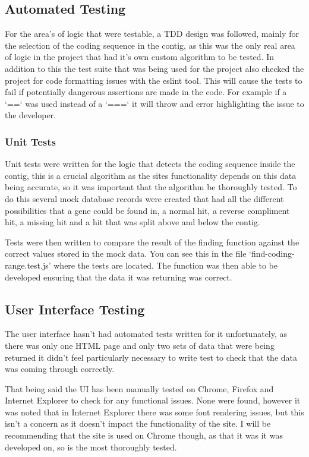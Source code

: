 \subsection{Automated Testing}
For the area's of logic that were testable, a TDD design was followed, mainly for the selection of the coding sequence in the contig, as this was the only real area of logic in the project that had it's own custom algorithm to be tested. In addition to this the test suite that was being used for the project also checked the project for code formatting issues with the eslint\cite{eslint} tool. This will cause the tests to fail if potentially dangerous assertions are made in the code. For example if a `==` was used instead of a `===` it will throw and error highlighting the issue to the developer. 

\subsubsection{Unit Tests}
Unit tests were written for the logic that detects the coding sequence inside the contig, this is a crucial algorithm as the sites functionality depends on this data being accurate, so it was important that the algorithm be thoroughly tested. To do this several mock database records were created that had all the different possibilities that a gene could be found in, a normal hit, a reverse compliment hit, a missing hit and a hit that was split above and below the contig. 

Tests were then written to compare the result of the finding function against the correct values stored in the mock data. You can see this in the file `find-coding-range.test.js' where the tests are located. The function was then able to be developed ensuring that the data it was returning was correct. 

\subsection{User Interface Testing}
The user interface hasn't had automated tests written for it unfortunately, as there was only one HTML page and only two sets of data that were being returned it didn't feel particularly necessary to write test to check that the data was coming through correctly. 

That being said the UI has been manually tested on Chrome, Firefox and Internet Explorer to check for any functional issues. None were found, however it was noted that in Internet Explorer there was some font rendering issues, but this isn't a concern as it doesn't impact the functionality of the site. I will be recommending that the site is used on Chrome though, as that it was it was developed on, so is the most thoroughly tested. 

